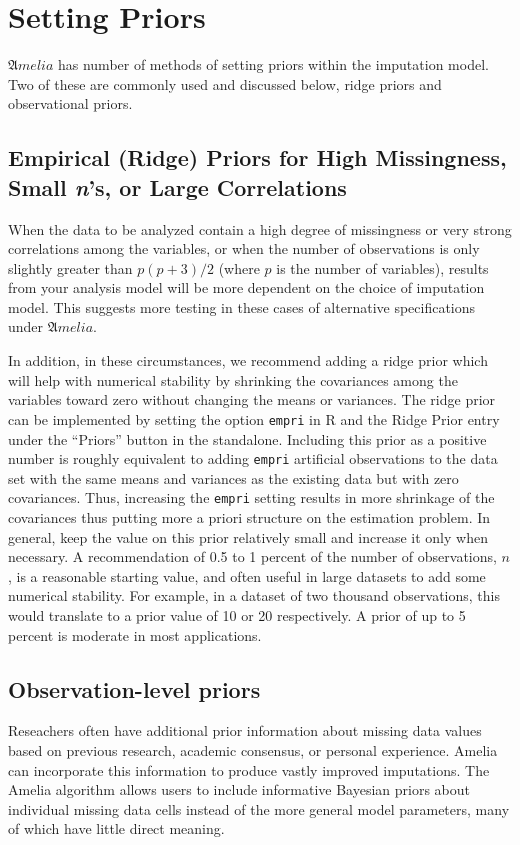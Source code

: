 \documentclass[12pt,titlepage]{article}
\begin{document}
\section{Setting Priors} \label{sec:obspri}

${\mathfrak Amelia}$ has number of methods of setting priors within the imputation model.  Two of these are commonly used and discussed below, ridge priors and observational priors.

\subsection{Empirical (Ridge) Priors for High Missingness, 
  Small \emph{n}'s, or Large Correlations}
\label{sec:prior}
When the data to be analyzed contain a high degree of missingness or
very strong correlations among the variables, or when the number of
observations is only slightly greater than $p(p+3)/2$ (where $p$ is
the number of variables), results from your analysis model will be
more dependent on the choice of imputation model.  This suggests more
testing in these cases of alternative specifications under ${\mathfrak
  Amelia}$.

In addition, in these circumstances, we recommend adding a ridge prior
which will help with numerical stability by shrinking the covariances
among the variables toward zero without changing the means or
variances.  The ridge prior can be implemented by setting the option
\texttt{empri} in R and the Ridge Prior entry under the ``Priors''
button in the standalone.  Including this prior as a positive number
is roughly equivalent to adding \texttt{empri} artificial observations
to the data set with the same means and variances as the existing data
but with zero covariances.  Thus, increasing the \texttt{empri}
setting results in more shrinkage of the covariances thus putting more
a priori structure on the estimation problem.  In general, keep the
value on this prior relatively small and increase it only when
necessary.  A recommendation of 0.5 to 1 percent of the number of observations, $n$, is a reasonable starting value, and often useful in large datasets to add some numerical stability.  For example, in a dataset of two thousand observations, this would translate to a prior value of 10 or 20 respectively.  A prior of up to 5 percent is moderate in most applications.

\subsection{Observation-level priors}
\label{sec:obspri}
Reseachers often have additional prior information about missing data 
values based on previous research, academic consensus, or personal 
experience.  Amelia can incorporate this information to produce vastly 
improved imputations.  The Amelia algorithm allows users to include 
informative Bayesian priors about individual missing data cells 
instead of the more general model parameters, many of which have 
little direct meaning.  
\end{document}
